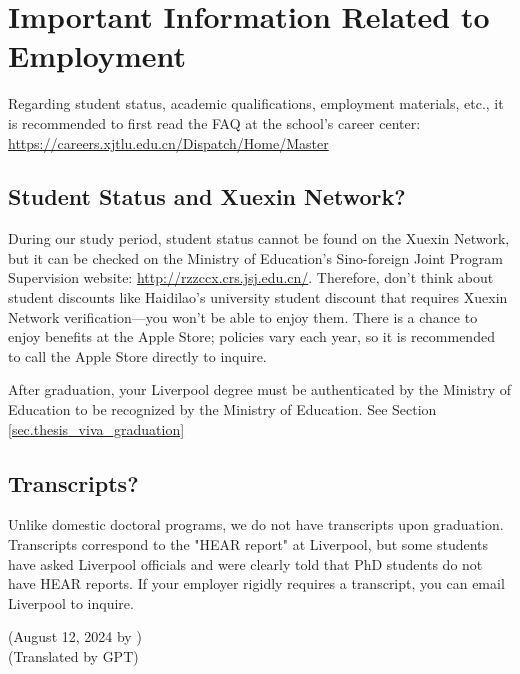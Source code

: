 \section{Important Information Related to Employment}

Regarding student status, academic qualifications, employment materials, etc., it is recommended to first read the FAQ at the school's career center: \url{https://careers.xjtlu.edu.cn/Dispatch/Home/Master}

\subsection{Student Status and Xuexin Network?}

During our study period, student status cannot be found on the Xuexin Network, but it can be checked on the Ministry of Education's Sino-foreign Joint Program Supervision website: \url{http://rzzccx.crs.jsj.edu.cn/}. Therefore, don't think about student discounts like Haidilao's university student discount that requires Xuexin Network verification—you won't be able to enjoy them. There is a chance to enjoy benefits at the Apple Store; policies vary each year, so it is recommended to call the Apple Store directly to inquire.

After graduation, your Liverpool degree must be authenticated by the Ministry of Education to be recognized by the Ministry of Education. See Section \ref{sec.thesis_viva_graduation}

\subsection{Transcripts?}

Unlike domestic doctoral programs, we do not have transcripts upon graduation. Transcripts correspond to the "HEAR report" at Liverpool, but some students have asked Liverpool officials and were clearly told that PhD students do not have HEAR reports. If your employer rigidly requires a transcript, you can email Liverpool to inquire.

\begin{flushright}
    (August 12, 2024 by \Wu) \\
    (Translated by GPT)
\end{flushright}



